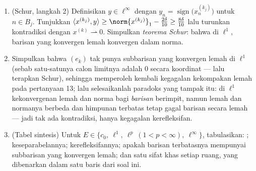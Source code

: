 \begin{problem}[{Soal akhir pekan --- $(\ell^p)' = \ell^q$,
kerefleksifan, dan keanehan $\ell^\infty$}]
\begin{enumerate}[resume]
        subbarisan. Tunjukkan lebih dahulu bahwa $x^{(k)}_n \to 0$ untuk
        setiap $n$ (lewat fungsional yang mana?), lalu bangunlah
        secara rekursif indeks $k_1 < k_2 < \cdots$ dan bilangan bulat
        $0 = N_0 < N_1 < N_2 < \cdots$ sedemikian sehingga massa
        $x^{(k_j)}$ memusat pada blok $B_j =
        \intoc{N_{j-1}}{N_j}$:
        \[
        \sum_{n \in B_j}\bigl|x^{(k_j)}_n\bigr| \geq
        \norm{x^{(k_j)}}_1 - \frac\delta{10} .
        \]
  \item (Schur, langkah 2) Definisikan $y \in \ell^\infty$ dengan $y_n =
        \operatorname{sign}\bigl(x^{(k_j)}_n\bigr)$ untuk $n \in
        B_j$. Tunjukkan $\langle x^{(k_j)}, y\rangle \geq
        \norm{x^{(k_j)}}_1 - \frac{2\delta}{10} \geq
        \frac{8\delta}{10}$ lalu turunkan kontradiksi dengan
        $x^{(k)} \rightharpoonup 0$. Simpulkan \emph{teorema
        Schur}: bahwa di $\ell^1$, barisan yang konvergen lemah
        konvergen dalam norma.
  \item Simpulkan bahwa $(e_k)$ tak punya subbarisan yang konvergen
        lemah di $\ell^1$ (sebab satu-satunya calon limitnya adalah
        $0$ secara koordinat --- lalu terapkan Schur), sehingga memperoleh kembali
        kegagalan kekompakan lemah pada pertanyaan 13; lalu selesaikanlah
        paradoks yang tampak itu: di $\ell^1$ kekonvergenan lemah dan norma bagi
        \emph{barisan} berimpit, namun
        \emph{} lemah dan normanya berbeda dan himpunan terbatas
        tetap gagal  barisan secara lemah ---
        jadi tak ada kontradiksi, hanya kegagalan kerefleksifan.
  \item (Tabel sintesis) Untuk $E \in \{c_0,\ \ell^1,\ \ell^p\
        (1{<}p{<}\infty),\ \ell^\infty\}$, tabulasikan: ;
        keseparabelannya; kerefleksifannya; apakah barisan terbatasnya
        mempunyai subbarisan yang konvergen lemah; dan satu
        sifat khas setiap ruang, yang dibenarkan dalam satu
        baris dari soal ini.
\end{enumerate}


\end{problem}
